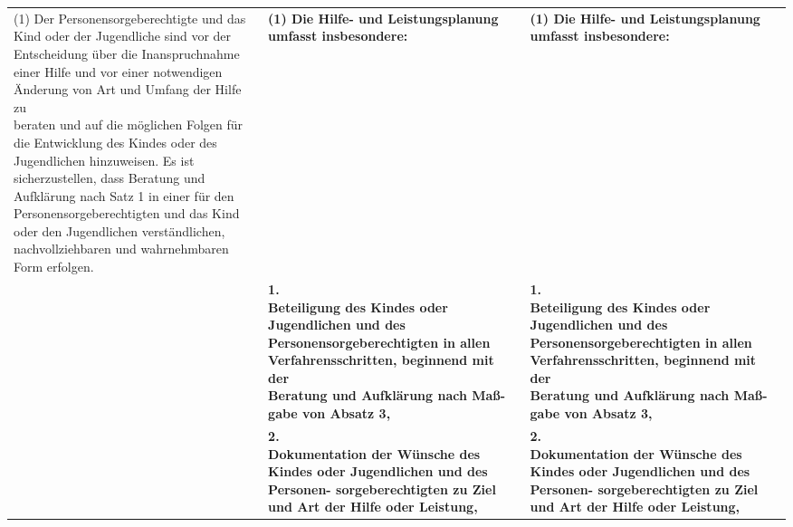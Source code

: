 \documentclass[10pt,a4paper,landscape]{article}
\begin{document}
\begin{longtable}{|L{8.2cm}|L{8.2cm}|L{8.2cm}|}
(1) \textcolor{diffred}{Der Personensorgeberechtigte} und \textcolor{diffred}{das  \newline Kind oder der Jugendliche sind vor der  \newline Entscheidung über die Inanspruchnahme  \newline einer Hilfe und vor einer notwendigen  \newline Änderung von Art und Umfang der Hilfe zu  \newline beraten und auf die möglichen Folgen für  \newline die Entwicklung des Kindes oder des  \newline Jugendlichen hinzuweisen. Es ist  \newline sicherzustellen, dass Beratung und  \newline Aufklärung nach Satz 1 in einer für den  \newline Personensorgeberechtigten und das Kind  \newline oder den Jugendlichen verständlichen,  \newline nachvollziehbaren und wahrnehmbaren  \newline Form erfolgen.} & \textbf{(1) Die Hilfe- und Leistungsplanung  \newline umfasst insbesondere: } & \textbf{(1) Die Hilfe- und Leistungsplanung  \newline umfasst insbesondere: } \\
\hhline{|---|}
 & \textbf{1.   \newline Beteiligung des Kindes oder  \newline Jugendlichen und des  \newline Personensorgeberechtigten in allen  \newline Verfahrensschritten, beginnend mit der  \newline Beratung und Aufklärung nach Maß- \newline gabe von Absatz 3, } & \textbf{1.   \newline Beteiligung des Kindes oder  \newline Jugendlichen und des  \newline Personensorgeberechtigten in allen  \newline Verfahrensschritten, beginnend mit der  \newline Beratung und Aufklärung nach Maß- \newline gabe von Absatz 3, } \\
\hhline{|---|}
 & \textbf{2.   \newline Dokumentation der Wünsche des  \newline Kindes oder Jugendlichen und des  \newline Personen- sorgeberechtigten zu Ziel  \newline und Art der Hilfe oder Leistung, } & \textbf{2.   \newline Dokumentation der Wünsche des  \newline Kindes oder Jugendlichen und des  \newline Personen- sorgeberechtigten zu Ziel  \newline und Art der Hilfe oder Leistung, } \\

\end{longtable}
\end{document}
